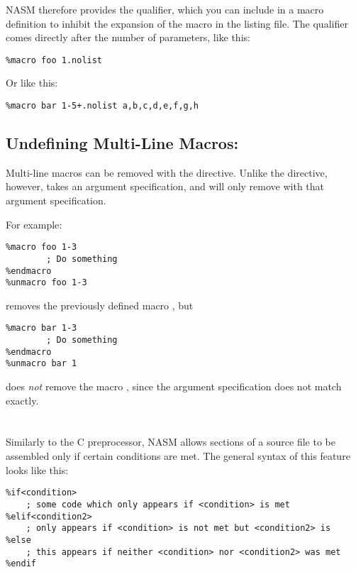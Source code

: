 NASM therefore provides the  qualifier, which you can
include in a macro definition to inhibit the expansion of the macro
in the listing file. The  qualifier comes directly after
the number of parameters, like this:

\begin{lstlisting}
%macro foo 1.nolist
\end{lstlisting}

Or like this:

\begin{lstlisting}
%macro bar 1-5+.nolist a,b,c,d,e,f,g,h
\end{lstlisting}

\subsection{Undefining Multi-Line Macros: }
\label{subsec:unmacro}

Multi-line macros can be removed with the  directive.
Unlike the  directive, however,  takes an
argument specification, and will only remove  with
that argument specification.

For example:

\begin{lstlisting}
%macro foo 1-3
        ; Do something
%endmacro
%unmacro foo 1-3
\end{lstlisting}

removes the previously defined macro , but

\begin{lstlisting}
%macro bar 1-3
        ; Do something
%endmacro
%unmacro bar 1
\end{lstlisting}

does \emph{not} remove the macro , since the argument
specification does not match exactly.

\section{}
\label{sec:condasm}

Similarly to the C preprocessor, NASM allows sections of a source
file to be assembled only if certain conditions are met. The general
syntax of this feature looks like this:

\begin{lstlisting}
%if<condition>
    ; some code which only appears if <condition> is met
%elif<condition2>
    ; only appears if <condition> is not met but <condition2> is
%else
    ; this appears if neither <condition> nor <condition2> was met
%endif
\end{lstlisting}

